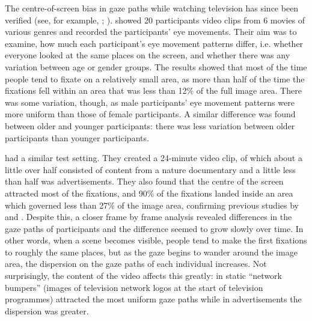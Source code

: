 \documentclass[output=paper]{langsci/langscibook}
\begin{document}
The centre-of-screen bias in gaze paths while watching television has since been verified (see, for example, \citet{goldstein2007}; \citet{brasel2008}). \citet{goldstein2007} showed 20 participants video clips from 6 movies of various genres and recorded the participants' eye movements. Their aim was to examine, how much each participant's eye movement patterns differ, i.e. whether everyone looked at the same places on the screen, and whether there was any variation between age or gender groups. The results showed that most of the time people tend to fixate on a relatively small area, as more than half of the time the fixations fell within an area that was less than 12\% of the full image area. There was some variation, though, as male participants' eye movement patterns were more uniform than those of female participants. A similar difference was found between older and younger participants: there was less variation between older participants than younger participants. 

\citet{brasel2008} had a similar test setting. They created a 24-minute video clip, of which about a little over half consisted of content from a nature documentary and a little less than half was advertisements. They also found that the centre of the screen attracted most of the fixations, and 90\% of the fixations landed inside an area which governed less than 27\% of the image area, confirming previous studies by \citet{tosi1997} and \citet{goldstein2007}. Despite this, a closer frame by frame analysis revealed differences in the gaze paths of participants and the difference seemed to grow slowly over time. In other words, when a scene becomes visible, people tend to make the first fixations to roughly the same places, but as the gaze begins to wander around the image area, the dispersion on the gaze paths of each individual increases. Not surprisingly, the content of the video affects this greatly: in \citet{brasel2008} static ``network bumpers'' (images of television network logos at the start of television programmes) attracted the most uniform gaze paths while in advertisements the dispersion was greater. 
\end{document}
